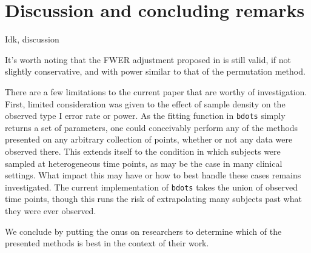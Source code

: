 \documentclass{article}
\newcommand{\xt}{\texttt}
\begin{document}
\section{Discussion and concluding remarks}

Idk, discussion

It's worth noting that the FWER adjustment proposed in \cite{Oleson2017} is still valid, if not slightly conservative, and with power similar to that of the permutation method.

There are a few limitations to the current paper that are worthy of investigation. First, limited consideration was given to the effect of sample density on the observed type I error rate or power. As the fitting function in \xt{bdots} simply returns a set of parameters, one could conceivably perform any of the methods presented on any arbitrary collection of points, whether or not any data were observed there. This extends itself to the condition in which subjects were sampled at heterogeneous time points, as may be the case in many clinical settings. What impact this may have or how to best handle these cases remains investigated. The current implementation of \xt{bdots} takes the union of observed time points, though this runs the risk of extrapolating many subjects past what they were ever observed.

We conclude by putting the onus on researchers to determine which of the presented methods is best in the context of their work.



\end{document}
